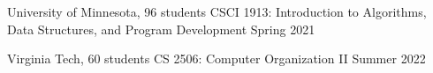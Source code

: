 
\begin{cventries}
  \cventry
    {University of Minnesota, 96 students} %
    {CSCI 1913: Introduction to Algorithms, Data Structures, and Program Development} %
    {Spring 2021} %
    {} %
    {}
    \vspace{-0.15in}
  
  \cventry
    {Virginia Tech, 60 students} %
    {CS 2506: Computer Organization II} %
    {Summer 2022} %
    {} %
    {}
    \vspace{-0.15in}

\end{cventries}
